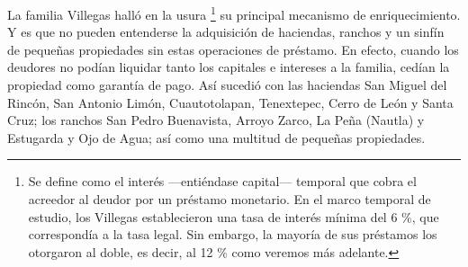 \documentclass[14pt,twoside,final]{extbook} %
\let\oldfootnote\footnote
\renewcommand\footnote[1]{%
\oldfootnote{\hspace{1mm}#1}}
\begin{document}
La familia Villegas halló en la usura\footnote{Se define como el interés ---entiéndase capital--- temporal que cobra el acreedor al deudor por un préstamo monetario. En el marco temporal de estudio, los Villegas establecieron una tasa de interés mínima del 6 \%, que correspondía a la tasa legal. Sin embargo, la mayoría de sus préstamos los otorgaron al doble, es decir, al 12 \% como veremos más adelante.} su principal mecanismo de enriquecimiento. Y es que no pueden entenderse la adquisición de haciendas, ranchos y un sinfín de pequeñas propiedades sin estas operaciones de préstamo. En efecto, cuando los deudores no podían liquidar tanto los capitales e intereses a la familia, cedían la propiedad como garantía de pago. Así sucedió con las haciendas San Miguel del Rincón, San Antonio Limón, Cuautotolapan, Tenextepec, Cerro de León y Santa Cruz; los ranchos San Pedro Buenavista, Arroyo Zarco, La Peña (Nautla) y Estugarda y Ojo de Agua; así como una multitud de pequeñas propiedades.
\end{document}
